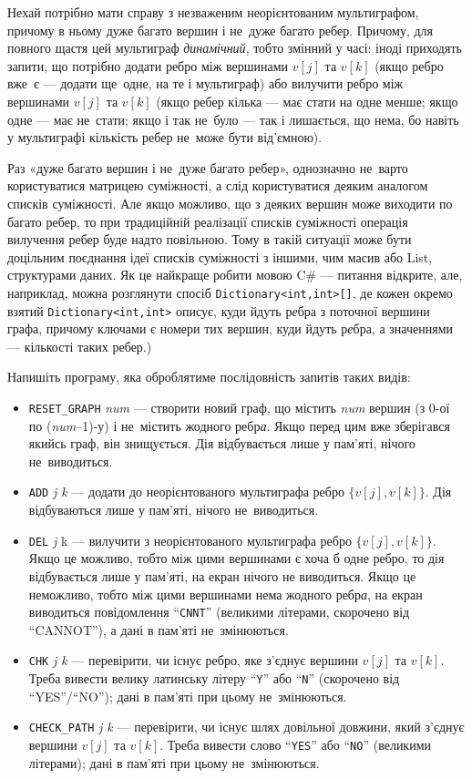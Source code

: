 ﻿Нехай потрібно мати справу з незваженим неорієнтованим мультиграфом, причому в ньому дуже багато вершин і не~дуже багато ребер. Причому, для повного щастя цей мультиграф {\it динамічний}, тобто змінний у часі: іноді приходять запити, що потрібно додати ребро між вершинами $v[j]$ та $v[k]$ (якщо ребро вже~є --- додати ще~одне, на те і мультиграф) або вилучити ребро між вершинами $v[j]$ та $v[k]$ (якщо ребер кілька --- має стати на одне менше; якщо одне --- має не~стати; якщо і так не~було --- так і лишається, що нема, бо навіть у мультиграфі кількість ребер не~може бути від’ємною).

Раз «дуже багато вершин і не~дуже багато ребер», однозначно не~варто користуватися матрицею суміжності, а слід користуватися деяким аналогом списків суміжності. Але якщо можливо, що з деяких вершин може виходити по багато ребер, то при традиційній реалізації списків суміжності операція вилучення ребер буде надто повільною. Тому в такій ситуації може бути доцільним поєднання ідеї списків суміжності з іншими, чим масив або List, структурами даних. Як це найкраще робити мовою C\# --- питання відкрите, але, наприклад, можна розглянути спосіб {\tt Dictionary<int,int>[]}, де кожен окремо взятий {\tt Dictionary<int,int>} описує, куди йдуть р{\it е}бра з поточної вершини графа, причому ключами є номери тих вершин, куди йдуть р{\it е}бра, а значеннями --- кількості таких ребер.)

Напишіть програму, яка оброблятиме послідовність запитів таких видів:

\begin{itemize}
\item
    {\tt RESET\_GRAPH} {\it num} --- створити новий граф, що містить {\it num} вершин (з 0-ої по ({\it num}–1)-у) і не~містить жодного ребр{\it а}. Якщо перед цим вже зберігався якийсь граф, він знищується. Дія відбувається лише у пам’яті, нічого не~виводиться.
\item
    {\tt ADD} {\it j k} --- додати до неорієнтованого мультиграфа ребро $\{v[j], v[k]\}$. Дія відбуваються лише у пам’яті, нічого не~виводиться.
\item
    {\tt DEL} {\it j }k --- вилучити з неорієнтованого мультиграфа ребро $\{v[j], v[k]\}$. Якщо це можливо, тобто між цими вершинами є хоча б одне ребро, то дія відбувається лише у пам’яті, на екран нічого не виводиться. Якщо це неможливо, тобто між цими вершинами нема жодного ребр{\it а}, на екран виводиться повідомлення ``{\tt CNNT}'' (великими літерами, скорочено від ``CANNOT''), а дані в пам’яті не~змінюються.
\item
    {\tt CHK} {\it j k} --- перевірити, чи існує ребро, яке з’єднує вершини $v[j]$ та $v[k]$. Треба вивести  велику латинську літеру ``{\tt Y}'' або ``{\tt N}'' (скорочено від ``YES''/``NO''); дані в пам’яті при цьому не~змінюються.
\item
    {\tt CHECK\_PATH} {\it j k} — перевірити, чи існує шлях довільної довжини, який з’єднує вершини $v[j]$ та $v[k]$. Треба вивести слово ``{\tt YES}'' або ``{\tt NO}'' (великими літерами); дані в пам’яті при цьому не~змінюються.
\end{itemize}

